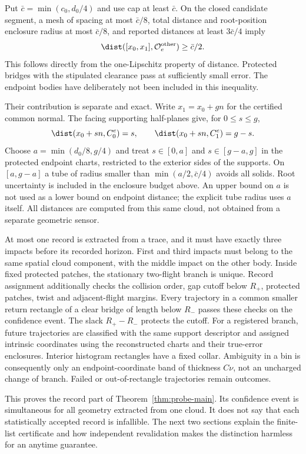 Put $\bar c=\min(c_0,d_0/4)$ and use cap at least $\bar c$. On the
closed candidate segment, a mesh of spacing at most $\bar c/8$, total
distance and root-position enclosure radius at most $\bar c/8$, and
reported distances at least $3\bar c/4$ imply
\[
 \dist([x_0,x_1],\mathcal O_e^{\rm other})\ge\bar c/2.
\]
This follows directly from the one-Lipschitz property of distance.
Protected bridges with the stipulated clearance pass at sufficiently
small error. The endpoint bodies have deliberately not been included
in this inequality.

Their contribution is separate and exact. Write $x_1=x_0+gn$ for the
certified common normal. The facing supporting half-planes give, for
$0\le s\le g$,
\[
 \dist(x_0+sn,C_0^e)=s,\qquad
 \dist(x_0+sn,C_1^e)=g-s.
\]
Choose $a=\min(d_0/8,g/4)$ and treat $s\in[0,a]$ and
$s\in[g-a,g]$ in the protected endpoint charts, restricted to the
exterior sides of the supports. On $[a,g-a]$ a tube of radius smaller
than $\min(a/2,\bar c/4)$ avoids all solids. Root uncertainty is included
in the enclosure budget above. An upper bound on $a$ is not used as a
lower bound on endpoint distance; the explicit tube radius uses $a$
itself. All distances are computed from this same cloud, not obtained
from a separate geometric sensor.

At most one record is extracted from a trace, and it must have exactly
three impacts before its recorded horizon. First and third impacts must belong to the same spatial cloud component,
with the middle impact on the other body. Inside fixed protected patches,
the stationary two-flight branch is unique. Record assignment additionally
checks the collision order, gap cutoff below $R_+$, protected patches,
twist and adjacent-flight margins. Every trajectory in a common smaller
return rectangle of a clear bridge of length below $R_-$ passes these
checks on the confidence event. The slack $R_+-R_-$ protects the cutoff.
For a registered branch, future trajectories are classified with the
same support descriptor and assigned intrinsic coordinates using the
reconstructed charts and their true-error enclosures. Interior histogram
rectangles have a fixed collar. Ambiguity in a bin is consequently only
an endpoint-coordinate band of thickness $C\nu$, not an uncharged change
of branch. Failed or out-of-rectangle trajectories remain outcomes.

This proves the record part of Theorem~\ref{thm:probe-main}. Its confidence
event is simultaneous for all geometry extracted from one cloud. It does
not say that each statistically accepted record is infallible. The next
two sections explain the finite-list certificate and how independent
revalidation makes the distinction harmless for an anytime guarantee.
